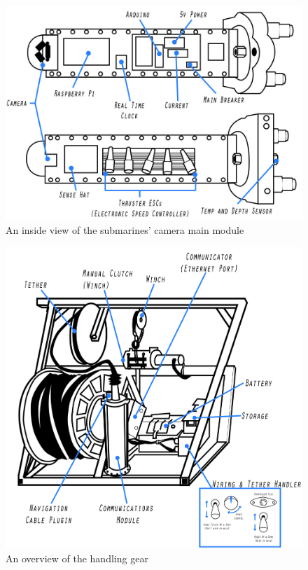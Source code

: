 \documentclass[
10pt, %
a4paper, %
oneside, %
headinclude,footinclude, %
BCOR5mm, %
]{scrartcl}
\begin{document}
\begin{figure}[H]
\centering 
\includegraphics[width=0.9\columnwidth]{Figures/Component_Diagrams/navigation_board.jpg}
\caption[]{An inside view of the submarines' camera main module} %
\end{figure}
\begin{figure}[H]
	\centering 
	\includegraphics[width=1\columnwidth]{Figures/Component_Diagrams/handling_gear.jpg}
	\caption[]{An overview of the handling gear} %
\end{figure}
\end{document}

